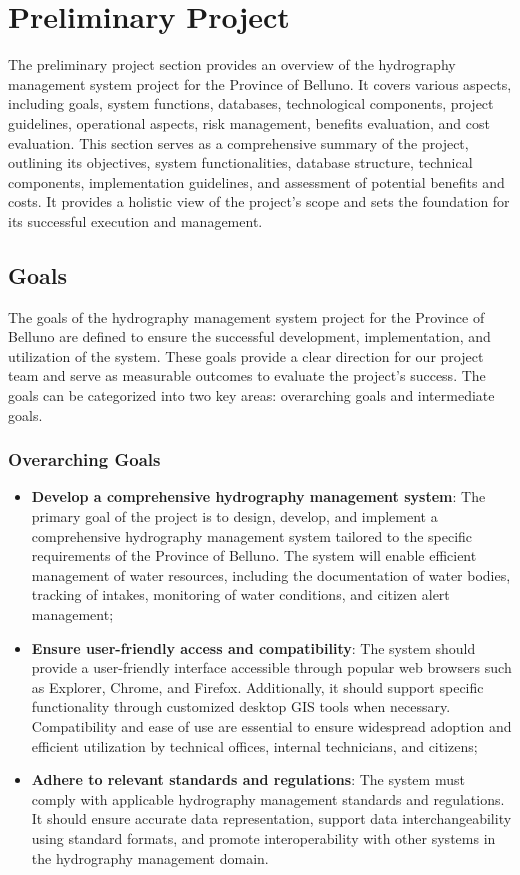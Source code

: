 \section{Preliminary Project}
\label{sec:preliminary_project}
The preliminary project section provides an overview of the hydrography management system project for the Province of Belluno. It covers various aspects, including goals, system functions, databases, technological components, project guidelines, operational aspects, risk management, benefits evaluation, and cost evaluation. This section serves as a comprehensive summary of the project, outlining its objectives, system functionalities, database structure, technical components, implementation guidelines, and assessment of potential benefits and costs. It provides a holistic view of the project's scope and sets the foundation for its successful execution and management.

\subsection{Goals}
The goals of the hydrography management system project for the Province of Belluno are defined to ensure the successful development, implementation, and utilization of the system. These goals provide a clear direction for our project team and serve as measurable outcomes to evaluate the project's success. The goals can be categorized into two key areas: overarching goals and intermediate goals.
\subsubsection{Overarching Goals}

\begin{itemize}
    \item \textbf{Develop a comprehensive hydrography management system}: The primary goal of the project is to design, develop, and implement a comprehensive hydrography management system tailored to the specific requirements of the Province of Belluno. The system will enable efficient management of water resources, including the documentation of water bodies, tracking of intakes, monitoring of water conditions, and citizen alert management;
    \item \textbf{Ensure user-friendly access and compatibility}: The system should provide a user-friendly interface accessible through popular web browsers such as Explorer, Chrome, and Firefox. Additionally, it should support specific functionality through customized desktop GIS tools when necessary. Compatibility and ease of use are essential to ensure widespread adoption and efficient utilization by technical offices, internal technicians, and citizens;
    \item \textbf{Adhere to relevant standards and regulations}: The system must comply with applicable hydrography management standards and regulations. It should ensure accurate data representation, support data interchangeability using standard formats, and promote interoperability with other systems in the hydrography management domain.
\end{itemize}

